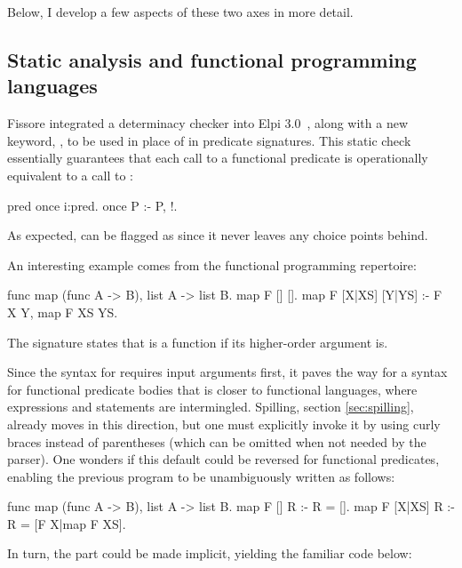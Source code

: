 \documentclass{these-ISSS}
\newenvironment{elpicode}
  {\VerbatimEnvironment\begin{elpibox}\begin{xelpicode}}{\end{xelpicode}
\end{elpibox}}
\begin{document}
Below, I develop a few aspects of these two axes in more detail.

\subsection{Static analysis and functional programming languages} 

Fissore
integrated a determinacy checker into Elpi 3.0~\cite{elpidet}, along with a new
keyword, , to be used in place of  in predicate
signatures. This static check essentially guarantees that each call to a
functional predicate  is operationally equivalent to a call to
:

\begin{elpicode}
pred once i:pred.
once P :- P, !.
\end{elpicode}

\noindent As expected,  can be flagged as  since it never
leaves any choice points behind.

An interesting example comes from the functional programming repertoire:
\begin{elpicode}
func map (func A -> B), list A -> list B.
map F [] [].
map F [X|XS] [Y|YS] :- F X Y, map F XS YS.
\end{elpicode}

\noindent The signature states that  is a function if its
higher-order argument  is. 

Since the syntax for  requires
input arguments first, it paves the way for a syntax for functional predicate
bodies that is closer to functional languages, where expressions and statements
are intermingled.
Spilling, section \ref{sec:spilling}, already moves in this direction, but one must
explicitly invoke it by using curly braces instead of parentheses (which can be
omitted when not needed by the parser). One wonders if this default could be
reversed for functional predicates, enabling the previous program to be
unambiguously written as follows:

\begin{elpicode}
func map (func A -> B), list A -> list B.
map F [] R :- R = [].
map F [X|XS] R :- R = [F X|map F XS].
\end{elpicode}

\noindent
In turn, the  part could be made implicit, yielding the familiar
code below:
\end{document}
